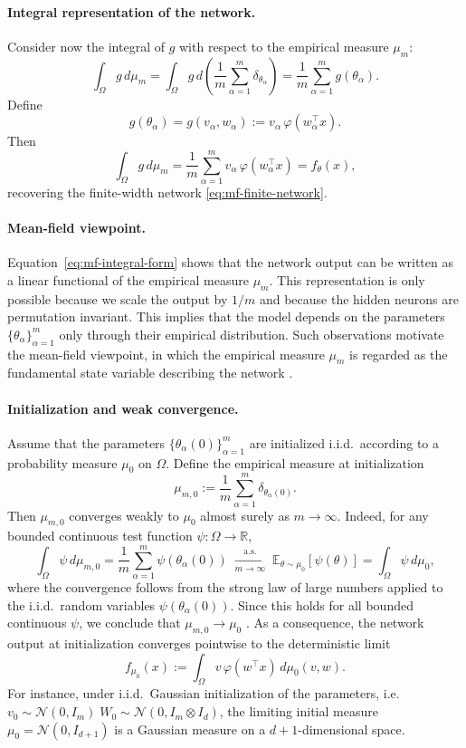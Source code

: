 \paragraph{Integral representation of the network.}
Consider now the integral of $g$ with respect to the empirical measure $\mu_m$:
\[
	\int_\Omega g\,d\mu_m
	=
	\int_\Omega g\,d\left(\frac{1}{m}\sum_{\alpha=1}^m \delta_{\theta_\alpha}\right)
	=
	\frac{1}{m}\sum_{\alpha=1}^m g(\theta_\alpha).
\]
Define
\[
	g(\theta_\alpha) = g(v_\alpha,w_\alpha) := v_\alpha\,\varphi(w_\alpha^\top x).
\]
Then
\begin{equation}
	\int_\Omega g\,d\mu_m
	=
	\frac{1}{m}\sum_{\alpha=1}^m v_\alpha\,\varphi(w_\alpha^\top x)
	=
	f_\theta(x),
	\label{eq:mf-integral-form}
\end{equation}
recovering the finite-width network \eqref{eq:mf-finite-network}.

\paragraph{Mean-field viewpoint.}
Equation~\eqref{eq:mf-integral-form} shows that the network output can be written
as a linear functional of the empirical measure $\mu_m$.
This representation is only possible because we scale the output by $1/m$ and
because the hidden neurons are permutation
invariant. This implies that the model depends on the
parameters $\{\theta_\alpha\}_{\alpha=1}^m$ only through their empirical
distribution.
Such observations motivate the mean-field viewpoint, in which the empirical
measure $\mu_m$ is regarded as the fundamental state variable describing the
network \citep{Mei2018meanfieldview,chizat2018globalconvergencegradientdescent}.

\paragraph{Initialization and weak convergence.}
Assume that the parameters $\{\theta_\alpha(0)\}_{\alpha=1}^m$ are initialized
i.i.d.\ according to a probability measure $\mu_0$ on $\Omega$.
Define the empirical measure at initialization
\[
	\mu_{m,0}
	:=
	\frac1m\sum_{\alpha=1}^m \delta_{\theta_\alpha(0)} .
\]
Then $\mu_{m,0}$ converges weakly to $\mu_0$ almost surely as $m\to\infty$.
Indeed, for any bounded continuous test function $\psi:\Omega\to\mathbb R$,
\[
	\int_\Omega \psi\,d\mu_{m,0}
	=
	\frac1m\sum_{\alpha=1}^m \psi(\theta_\alpha(0))
	\;\xrightarrow[m \to \infty]{\text{a.s.}}\;
	\mathbb E_{\theta\sim\mu_0}[\psi(\theta)]
	=
	\int_\Omega \psi\,d\mu_0,
\]
where the convergence follows from the strong law of large numbers applied to
the i.i.d.\ random variables $\psi(\theta_\alpha(0))$.
Since this holds for all bounded continuous $\psi$, we conclude that
$\mu_{m,0} \to \mu_0$ \citep{vadaranjan1958convergenceofprobabilitydistribution}.
As a consequence, the network output at initialization converges pointwise to
the deterministic limit
\[
	f_{\mu_0}(x)
	:=
	\int_\Omega v\,\varphi(w^\top x)\,d\mu_0(v,w).
\]
For instance, under i.i.d.\ Gaussian initialization of the parameters, i.e.
$v_0 \sim \mathcal{N}(0,I_m)\; W_0 \sim \mathcal{N}(0, I_m \otimes I_d)$, the
limiting initial measure $\mu_0 = \mathcal{N}(0, I_{d+1})$ is a Gaussian
measure on a $d+1$-dimensional space.


